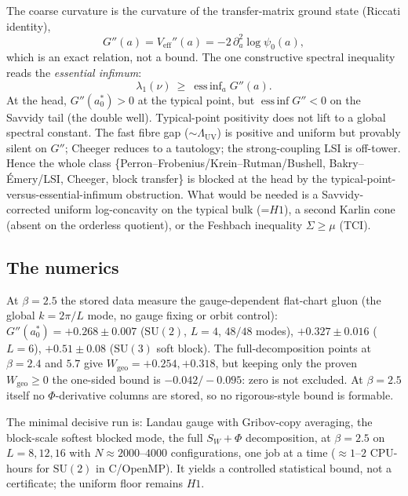 \documentclass[11pt,a4paper]{article}
\newcommand{\labb}[2]{\fcolorbox{#1!35}{#1!8}{\textcolor{#1}{\textbf{\scriptsize #2}}}}
\newcommand{\LN}{\labb{cN}{N}}
\begin{document}
The coarse curvature is the curvature of the transfer-matrix ground state (Riccati identity),
\begin{equation}
G''(a)=V_{\mathrm{eff}}''(a)=-2\,\partial_a^2\log\psi_0(a),
\label{eq:riccati}
\end{equation}
which is an exact relation, not a bound. The one constructive spectral inequality reads the
\emph{essential infimum}:
\begin{equation}
\lambda_1(\nu)\ \ge\ \operatorname{ess\,inf}_a G''(a).
\label{eq:essinf}
\end{equation}
At the head, $G''(a_0^*)>0$ at the typical point, but $\operatorname{ess\,inf}G''<0$ on the Savvidy
tail (the double well). Typical-point positivity does not lift to a global spectral constant. The
fast fibre gap ($\sim\Lambda_{\mathrm{UV}}$) is positive and uniform but provably silent on $G''$;
Cheeger reduces to a tautology; the strong-coupling LSI is off-tower. Hence the whole class
\{Perron--Frobenius/Krein--Rutman/Bushell, Bakry--\'Emery/LSI, Cheeger, block transfer\} is blocked
at the head \LN{} by the typical-point-versus-essential-infimum obstruction. What would be needed is
a Savvidy-corrected uniform log-concavity on the typical bulk (=$H1$), a second Karlin cone (absent
on the orderless quotient), or the Feshbach inequality $\Sigma\ge\mu$ (TCI).

\subsection{The numerics}
\label{sec:headnum}

At $\beta=2.5$ the stored data measure the gauge-dependent flat-chart gluon (the global
$k=2\pi/L$ mode, no gauge fixing or orbit control): $G''(a_0^*)=+0.268\pm0.007$ ($\mathrm{SU}(2)$,
$L=4$, $48/48$ modes), $+0.327\pm0.016$ ($L=6$), $+0.51\pm0.08$ ($\mathrm{SU}(3)$ soft block). The
full-decomposition points at $\beta=2.4$ and $5.7$ give $W_{\mathrm{geo}}=+0.254,+0.318$, but
keeping only the proven $W_{\mathrm{geo}}\ge0$ the one-sided bound is $-0.042/-0.095$: zero is not
excluded. At $\beta=2.5$ itself no $\Phi$-derivative columns are stored, so no rigorous-style bound
is formable.

The minimal decisive run is: Landau gauge with Gribov-copy averaging, the block-scale softest
blocked mode, the full $S_W+\Phi$ decomposition, at $\beta=2.5$ on $L=8,12,16$ with
$N\approx2000$--$4000$ configurations, one job at a time ($\approx1$--$2$ CPU-hours for
$\mathrm{SU}(2)$ in C/OpenMP). It yields a controlled statistical bound, not a certificate; the
uniform floor remains $H1$.
\end{document}
